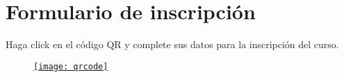 \section*{Formulario de inscripción}

Haga click en el código QR y complete sus datos para la inscripción
del curso.

\begin{figure}[ht!]
  \centering
  \href{https://docs.google.com/spreadsheets/d/1a9oeJ7al-g58u4nRNeKJQ2sihxVG7mZTZM-kIhISZEA/edit?usp=sharing}{
    \texttt{[image: qrcode]}}
\end{figure}